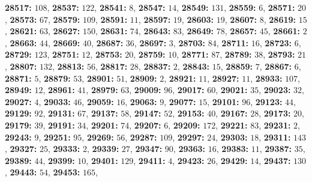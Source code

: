 \textsf{\bfseries 28517:} $108$, \textsf{\bfseries 28537:} $122$, \textsf{\bfseries 28541:} $8$, \textsf{\bfseries 28547:} $14$, \textsf{\bfseries 28549:} $131$, \textsf{\bfseries 28559:} $6$, \textsf{\bfseries 28571:} $20$, \textsf{\bfseries 28573:} $67$, \textsf{\bfseries 28579:} $109$, \textsf{\bfseries 28591:} $11$, \textsf{\bfseries 28597:} $19$, \textsf{\bfseries 28603:} $19$, \textsf{\bfseries 28607:} $8$, \textsf{\bfseries 28619:} $15$, \textsf{\bfseries 28621:} $63$, \textsf{\bfseries 28627:} $150$, \textsf{\bfseries 28631:} $74$, \textsf{\bfseries 28643:} $83$, \textsf{\bfseries 28649:} $78$, \textsf{\bfseries 28657:} $45$, \textsf{\bfseries 28661:} $2$, \textsf{\bfseries 28663:} $44$, \textsf{\bfseries 28669:} $40$, \textsf{\bfseries 28687:} $36$, \textsf{\bfseries 28697:} $3$, \textsf{\bfseries 28703:} $84$, \textsf{\bfseries 28711:} $16$, \textsf{\bfseries 28723:} $6$, \textsf{\bfseries 28729:} $123$, \textsf{\bfseries 28751:} $12$, \textsf{\bfseries 28753:} $20$, \textsf{\bfseries 28759:} $10$, \textsf{\bfseries 28771:} $87$, \textsf{\bfseries 28789:} $38$, \textsf{\bfseries 28793:} $21$, \textsf{\bfseries 28807:} $132$, \textsf{\bfseries 28813:} $56$, \textsf{\bfseries 28817:} $28$, \textsf{\bfseries 28837:} $2$, \textsf{\bfseries 28843:} $15$, \textsf{\bfseries 28859:} $7$, \textsf{\bfseries 28867:} $6$, \textsf{\bfseries 28871:} $5$, \textsf{\bfseries 28879:} $53$, \textsf{\bfseries 28901:} $51$, \textsf{\bfseries 28909:} $2$, \textsf{\bfseries 28921:} $11$, \textsf{\bfseries 28927:} $11$, \textsf{\bfseries 28933:} $107$, \textsf{\bfseries 28949:} $12$, \textsf{\bfseries 28961:} $41$, \textsf{\bfseries 28979:} $63$, \textsf{\bfseries 29009:} $96$, \textsf{\bfseries 29017:} $60$, \textsf{\bfseries 29021:} $35$, \textsf{\bfseries 29023:} $32$, \textsf{\bfseries 29027:} $4$, \textsf{\bfseries 29033:} $46$, \textsf{\bfseries 29059:} $16$, \textsf{\bfseries 29063:} $9$, \textsf{\bfseries 29077:} $15$, \textsf{\bfseries 29101:} $96$, \textsf{\bfseries 29123:} $44$, \textsf{\bfseries 29129:} $92$, \textsf{\bfseries 29131:} $67$, \textsf{\bfseries 29137:} $58$, \textsf{\bfseries 29147:} $52$, \textsf{\bfseries 29153:} $40$, \textsf{\bfseries 29167:} $28$, \textsf{\bfseries 29173:} $20$, \textsf{\bfseries 29179:} $39$, \textsf{\bfseries 29191:} $34$, \textsf{\bfseries 29201:} $74$, \textsf{\bfseries 29207:} $6$, \textsf{\bfseries 29209:} $172$, \textsf{\bfseries 29221:} $83$, \textsf{\bfseries 29231:} $2$, \textsf{\bfseries 29243:} $9$, \textsf{\bfseries 29251:} $95$, \textsf{\bfseries 29269:} $56$, \textsf{\bfseries 29287:} $109$, \textsf{\bfseries 29297:} $24$, \textsf{\bfseries 29303:} $18$, \textsf{\bfseries 29311:} $143$, \textsf{\bfseries 29327:} $25$, \textsf{\bfseries 29333:} $2$, \textsf{\bfseries 29339:} $27$, \textsf{\bfseries 29347:} $90$, \textsf{\bfseries 29363:} $16$, \textsf{\bfseries 29383:} $11$, \textsf{\bfseries 29387:} $35$, \textsf{\bfseries 29389:} $44$, \textsf{\bfseries 29399:} $10$, \textsf{\bfseries 29401:} $129$, \textsf{\bfseries 29411:} $4$, \textsf{\bfseries 29423:} $26$, \textsf{\bfseries 29429:} $14$, \textsf{\bfseries 29437:} $130$, \textsf{\bfseries 29443:} $54$, \textsf{\bfseries 29453:} $165$, 
